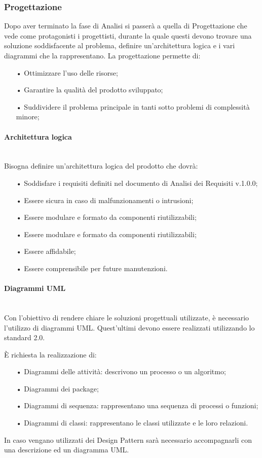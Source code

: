 \subsubsection{Progettazione}
Dopo aver terminato la fase di Analisi si passerà a quella di Progettazione che vede come protagonisti i progettisti, durante la quale questi devono trovare una soluzione soddisfacente al problema, definire un'architettura logica e i vari diagrammi che la rappresentano.
La progettazione permette di: 
\begin{itemize}
\item[•] Ottimizzare l'uso delle risorse;
\item[•] Garantire la qualità del prodotto sviluppato;
\item[•] Suddividere il problema principale in tanti sotto problemi di complessità minore;
\end{itemize}

\paragraph{Architettura logica}\mbox{}\\
Bisogna definire un'architettura logica del prodotto che dovrà: 
\begin{itemize}
\item[•] Soddisfare i requisiti definiti nel documento di Analisi dei Requisiti v.1.0.0;
\item[•] Essere sicura in caso di malfunzionamenti o intrusioni;
\item[•] Essere modulare e formato da componenti riutilizzabili;
\item[•] Essere modulare e formato da componenti riutilizzabili;
\item[•] Essere affidabile;
\item[•] Essere comprensibile per future manutenzioni.
\end{itemize}
\paragraph{Diagrammi UML}\mbox{}\\
Con l'obiettivo di rendere chiare le soluzioni progettuali utilizzate, è necessario l'utilizzo di {diagrammi UML}. Quest'ultimi devono essere realizzati utilizzando lo standard 2.0.

È richiesta la realizzazione di:
\begin{itemize}
\item[•] Diagrammi delle attività: descrivono un processo o un algoritmo;
\item[•] Diagrammi dei package;
\item[•] Diagrammi di sequenza: rappresentano una sequenza di processi o funzioni;
\item[•] Diagrammi di classi: rappresentano le classi utilizzate e le loro relazioni.
\end{itemize}
In caso vengano utilizzati dei Design Pattern sarà necessario accompagnarli con una descrizione ed un diagramma UML.


